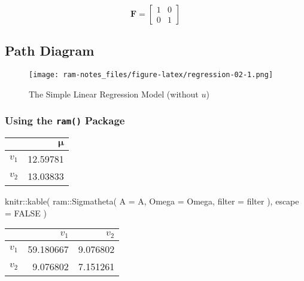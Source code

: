 \documentclass[
]{book}
\newenvironment{Shaded}{\begin{snugshade}}{\end{snugshade}}
\newcommand{\AttributeTok}[1]{\textcolor[rgb]{0.77,0.63,0.00}{#1}}
\newcommand{\ConstantTok}[1]{\textcolor[rgb]{0.00,0.00,0.00}{#1}}
\newcommand{\FunctionTok}[1]{\textcolor[rgb]{0.00,0.00,0.00}{#1}}
\newcommand{\NormalTok}[1]{#1}
\newcommand{\SpecialCharTok}[1]{\textcolor[rgb]{0.00,0.00,0.00}{#1}}
\newcommand{\StringTok}[1]{\textcolor[rgb]{0.31,0.60,0.02}{#1}}
\begin{document}
\begin{equation}
  \mathbf{F}
  =
  \begin{bmatrix}
    1 & 0 \\
    0 & 1
  \end{bmatrix}
\end{equation}

\hypertarget{path-diagram-1}{%
\subsection{Path Diagram}\label{path-diagram-1}}

\begin{figure}
\centering
\texttt{[image: ram-notes\_files/figure-latex/regression-02-1.png]}
\caption{\label{fig:regression-02}The Simple Linear Regression Model (without \(u\))}
\end{figure}

\hypertarget{using-the-ram-package-1}{%
\subsubsection{\texorpdfstring{Using the \texttt{ram()} Package}{Using the ram() Package}}\label{using-the-ram-package-1}}

\begin{Shaded}
\end{Shaded}

\begin{tabular}{l|r}
\hline
  & $\boldsymbol{\mu}$\\
\hline
$v_1$ & 12.59781\\
\hline
$v_2$ & 13.03833\\
\hline
\end{tabular}

\begin{Shaded}
\begin{Highlighting}[]
\NormalTok{knitr}\SpecialCharTok{::}\FunctionTok{kable}\NormalTok{(}
\NormalTok{  ram}\SpecialCharTok{::}\FunctionTok{Sigmatheta}\NormalTok{(}
    \AttributeTok{A =}\NormalTok{ A,}
    \AttributeTok{Omega =}\NormalTok{ Omega,}
    \AttributeTok{filter =}\NormalTok{ filter}
\NormalTok{  ),}
  \AttributeTok{escape =} \ConstantTok{FALSE}
\NormalTok{)}
\end{Highlighting}
\end{Shaded}

\begin{tabular}{l|r|r}
\hline
  & $v_1$ & $v_2$\\
\hline
$v_1$ & 59.180667 & 9.076802\\
\hline
$v_2$ & 9.076802 & 7.151261\\
\hline
\end{tabular}

  
\end{document}

